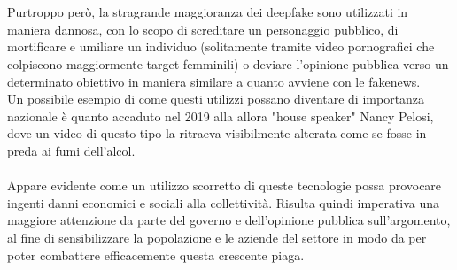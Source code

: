 \documentclass[12pt, a4paper]{article}
\begin{document}
\\\\
Purtroppo però, la stragrande maggioranza dei deepfake sono utilizzati in maniera dannosa, con lo scopo di screditare un personaggio pubblico, di mortificare e umiliare un individuo (solitamente tramite video pornografici che colpiscono maggiormente target femminili) o deviare l'opinione pubblica verso un determinato obiettivo in maniera similare a quanto avviene con le fakenews.
\\
Un possibile esempio di come questi utilizzi possano diventare di importanza nazionale è quanto accaduto nel 2019 alla allora "house speaker" Nancy Pelosi, dove un video di questo tipo la ritraeva visibilmente alterata come se fosse in preda ai fumi dell'alcol\cite{FakeVideoNancyPelosi}.
\\\\%
Appare evidente come un utilizzo scorretto di queste tecnologie possa provocare ingenti danni economici e sociali alla collettività. Risulta quindi imperativa una maggiore attenzione da parte del governo e dell'opinione pubblica sull'argomento, al fine di sensibilizzare la popolazione e le aziende del settore in modo da per poter combattere efficacemente questa crescente piaga.



\newpage


\end{document}
